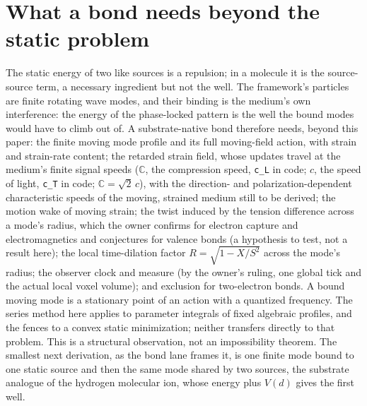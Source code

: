 \documentclass[aps,prd,onecolumn,amsmath,amssymb,longbibliography,floatfix,nofootinbib]{revtex4-2}
\begin{document}
\section{What a bond needs beyond the static problem}
\label{sec:bonds}
The static energy of two like sources is a repulsion; in a molecule it is the source-source term, a necessary ingredient but not the well. The framework's particles are finite rotating wave modes, and their binding is the medium's own interference: the energy of the phase-locked pattern is the well the bound modes would have to climb out of. A substrate-native bond therefore needs, beyond this paper: the finite moving mode profile and its full moving-field action, with strain and strain-rate content; the retarded strain field, whose updates travel at the medium's finite signal speeds ($\mathbb{C}$, the compression speed, \texttt{c\_L} in code; $c$, the speed of light, \texttt{c\_T} in code; $\mathbb{C}=\sqrt2\,c$), with the direction- and polarization-dependent characteristic speeds of the moving, strained medium still to be derived; the motion wake of moving strain; the twist induced by the tension difference across a mode's radius, which the owner confirms for electron capture and electromagnetics and conjectures for valence bonds (a hypothesis to test, not a result here); the local time-dilation factor $R=\sqrt{1-X/S^2}$ across the mode's radius; the observer clock and measure (by the owner's ruling, one global tick and the actual local voxel volume); and exclusion for two-electron bonds. A bound moving mode is a stationary point of an action with a quantized frequency. The series method here applies to parameter integrals of fixed algebraic profiles, and the fences to a convex static minimization; neither transfers directly to that problem. This is a structural observation, not an impossibility theorem. The smallest next derivation, as the bond lane frames it, is one finite mode bound to one static source and then the same mode shared by two sources, the substrate analogue of the hydrogen molecular ion, whose energy plus $V(d)$ gives the first well.
\end{document}
